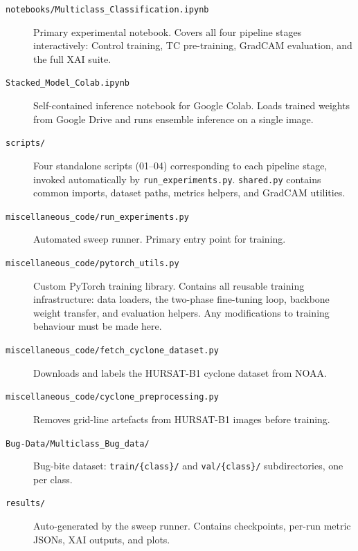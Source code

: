 \documentclass[12pt,a4paper]{article}
\begin{document}
\begin{description}
    \item[\texttt{notebooks/Multiclass\_Classification.ipynb}]
          Primary experimental notebook. Covers all four pipeline stages
          interactively: Control training, TC pre-training, GradCAM
          evaluation, and the full XAI suite.

    \item[\texttt{Stacked\_Model\_Colab.ipynb}]
          Self-contained inference notebook for Google Colab. Loads trained
          weights from Google Drive and runs ensemble inference on a single
          image.

    \item[\texttt{scripts/}]
          Four standalone scripts (01--04) corresponding to each pipeline
          stage, invoked automatically by \texttt{run\_experiments.py}.
          \texttt{shared.py} contains common imports, dataset paths,
          metrics helpers, and GradCAM utilities.

    \item[\texttt{miscellaneous\_code/run\_experiments.py}]
          Automated sweep runner. Primary entry point for training.

    \item[\texttt{miscellaneous\_code/pytorch\_utils.py}]
          Custom PyTorch training library. Contains all reusable training
          infrastructure: data loaders, the two-phase fine-tuning loop,
          backbone weight transfer, and evaluation helpers. Any
          modifications to training behaviour must be made here.

    \item[\texttt{miscellaneous\_code/fetch\_cyclone\_dataset.py}]
          Downloads and labels the HURSAT-B1 cyclone dataset from NOAA.

    \item[\texttt{miscellaneous\_code/cyclone\_preprocessing.py}]
          Removes grid-line artefacts from HURSAT-B1 images before
          training.

    \item[\texttt{Bug-Data/Multiclass\_Bug\_data/}]
          Bug-bite dataset: \texttt{train/\{class\}/} and
          \texttt{val/\{class\}/} subdirectories, one per class.

    \item[\texttt{results/}]
          Auto-generated by the sweep runner. Contains checkpoints,
          per-run metric JSONs, XAI outputs, and plots.
\end{description}
\end{document}

